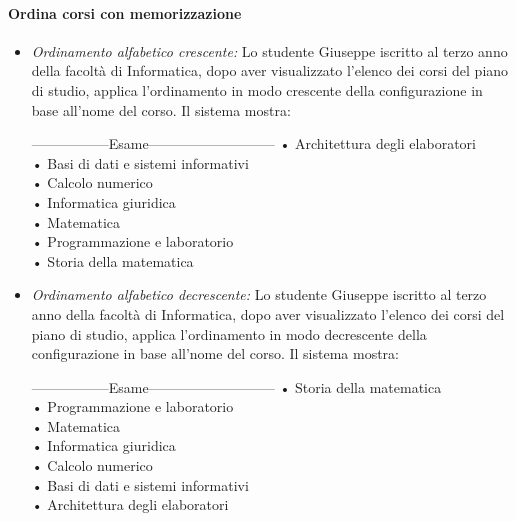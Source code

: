 \paragraph{Ordina corsi con memorizzazione}
\begin{itemize}
	\item \textit{Ordinamento alfabetico crescente:}
	Lo studente Giuseppe iscritto al terzo anno della facoltà di Informatica, dopo aver visualizzato l'elenco dei corsi del piano di studio, applica l'ordinamento in modo crescente della configurazione in base all’nome del corso. Il sistema mostra:
	\begin{tabbing}
		\hspace{1cm}-----------------Esame--------------------------- \kill
		\hspace{1cm} • Architettura degli elaboratori \\
		\hspace{1cm} • Basi di dati e sistemi informativi \\
		\hspace{1cm} • Calcolo numerico \\
		\hspace{1cm} • Informatica giuridica \\
		\hspace{1cm} • Matematica \\
		\hspace{1cm} • Programmazione e laboratorio \\
		\hspace{1cm} • Storia della matematica \\
	\end{tabbing}
	
	\item \textit{Ordinamento alfabetico decrescente:}
	Lo studente Giuseppe iscritto al terzo anno della facoltà di Informatica, dopo aver visualizzato l'elenco dei corsi del piano di studio, applica l'ordinamento in modo decrescente della configurazione in base all’nome del corso. Il sistema mostra:
	\begin{tabbing}
		\hspace{1cm}-----------------Esame---------------------------\kill
		\hspace{1cm} • Storia della matematica \\
		\hspace{1cm} • Programmazione e laboratorio \\
		\hspace{1cm} • Matematica \\
		\hspace{1cm} • Informatica giuridica \\
		\hspace{1cm} • Calcolo numerico \\
		\hspace{1cm} • Basi di dati e sistemi informativi \\
		\hspace{1cm} • Architettura degli elaboratori \\
	\end{tabbing}
	

\end{itemize}
